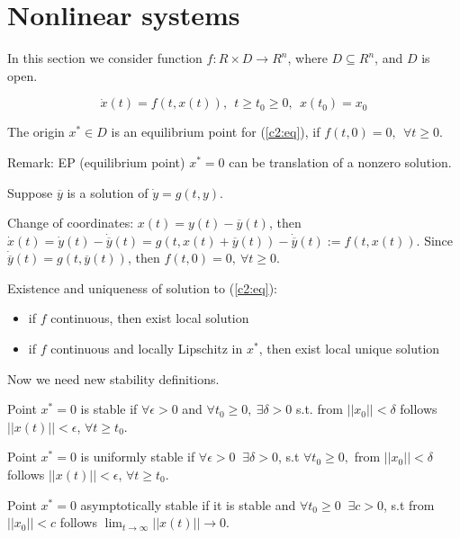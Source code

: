 \section{Nonlinear systems}

In this section we consider function $f:R\times D\rightarrow R^n$,
where $D \subseteq R^n$, and $D$ is open.

\begin{equation}\label{c2:eq}
 \dot x(t)=f(t,x(t)), \ \ t \ge t_0 \ge 0,\ \ x(t_0)=x_0
\end{equation} 

The origin $x^* \in D$ is an equilibrium point for (\ref{c2:eq}),
if $f(t,0)=0, \ \ \forall t \ge 0$.

Remark: EP (equilibrium point) $x^*=0$ can be translation of a nonzero
solution.

Suppose $\overline{y}$ is a solution of $\dot y = g(t, y)$.

Change of coordinates: $x(t)=y(t)-\overline{y}(t)$, then
$\dot x(t) = \dot y(t)-\dot{\overline{y}}(t)=
g(t, x(t)+\overline{y}(t)) - \dot{\overline{y}}(t):=f(t,x(t))$.
Since $\dot{\overline{y}}(t)=g(t,\overline{y}(t))$, then
$f(t,0)=0,\ \forall t \ge 0$.

Existence and uniqueness of solution to (\ref{c2:eq}):
\begin{itemize}
 \item if $f$ continuous, then exist local solution
 \item if $f$ continuous and locally Lipschitz in $x^*$, then
 	exist local unique solution 
\end{itemize}


Now we need new stability definitions.

\begin{Definition}
 Point $x^*=0$ is stable if $\forall \epsilon > 0$ and 
 $\forall t_0 \ge 0,\ \exists \delta>0$ s.t. from $||x_0||<\delta$
 follows $||x(t)|| < \epsilon$, $\forall t  \ge t_0$.
\end{Definition}

\begin{Definition}
 Point $x^*=0$ is uniformly stable if $\forall \epsilon > 0\ $  
 $\exists \delta>0$, s.t $\forall t_0 \ge 0,$ from $||x_0||<\delta$
 follows $||x(t)|| < \epsilon$, $\forall t  \ge t_0$.
\end{Definition}

\begin{Definition}
 Point $x^*=0$ asymptotically stable if it is stable and $\forall t_0 \ge 0\ $  
 $\exists c>0$, s.t from $||x_0||<c$
 follows $\lim_{t\to \infty} ||x(t)|| \to 0$.
\end{Definition}


